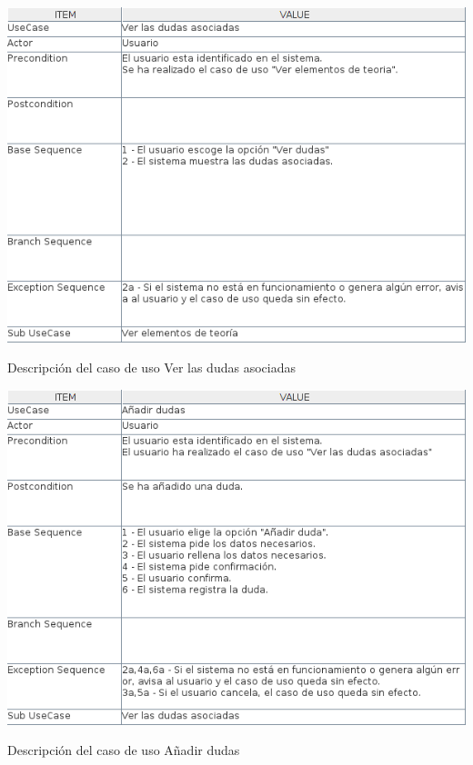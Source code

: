 \documentclass[openright,twoside,10pt]{book}
\begin{document}
    \vspace*{\fill}
    
    \newpage
    
    \vspace*{\fill}
    
    \begin{table}[H]
        \begin{center}
            \includegraphics[width=\textwidth]{img/astah/analisis/casos_de_uso/useCase03.png}
        \end{center}
        \caption{Descripción del caso de uso Ver las dudas asociadas}
    \end{table}
    
    \vspace*{\fill}
    
    \newpage
    
    \vspace*{\fill}
    
    \begin{table}[H]
        \begin{center}
            \includegraphics[width=\textwidth]{img/astah/analisis/casos_de_uso/useCase04.png}
        \end{center}
        \caption{Descripción del caso de uso Añadir dudas}
    \end{table}
    
\end{document}
